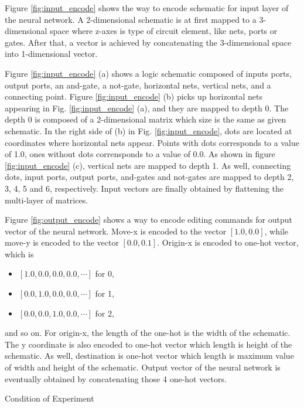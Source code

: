 \documentclass[twocolumn]{article}
\makeatletter
\def\section{\@startsection {section}{1}{\z@}{20pt plus 2pt minus 2pt}
{8pt plus 2pt minus 2pt}{\centering\normalsize\sc
\edef\@svsec{\thesection.\ }}}
\def\thesection{\Roman{section}}
\makeatother
\begin{document}
Figure \ref{fig:input_encode} shows the way to encode schematic
for input layer of the neural network.
A 2-dimensional schematic is at first mapped to a 3-dimensional space
where z-axes is type of circuit element, like nets, ports or gates.
After that, a vector is achieved by concatenating the 3-dimensional space
into 1-dimensional vector.

Figure \ref{fig:input_encode} (a) shows a logic schematic composed of
inputs ports, output ports, an and-gate, a not-gate,
horizontal nets, vertical nets, and a connecting point.
Figure \ref{fig:input_encode} (b) picks up horizontal nets appearing
in Fig. \ref{fig:input_encode} (a), and they are mapped to depth 0.
The depth 0 is composed of a 2-dimensional matrix which size is the same
as given schematic.
In the right side of (b) in Fig. \ref{fig:input_encode},
dots are located at coordinates where horizontal nets appear.
Points with dots corresponds to a value of 1.0, ones without dots
corrensponds to a value of 0.0.
As shown in figure \ref{fig:input_encode} (c),
vertical nets are mapped to depth 1.
As well, connecting dots, input ports, output ports, and-gates and not-gates
are mapped to depth 2, 3, 4, 5 and 6, respectively.
Input vectors are finally obtained by flattening the multi-layer of matrices.

Figure \ref{fig:output_encode} shows a way to encode editing commands
for output vector of the neural network.
Move-x is encoded to the vector $[1.0, 0.0]$, 
while move-y is encoded to the vector $[0.0, 0.1]$. 
Origin-x is encoded to one-hot vector, which is
\begin{itemize}
\item $[1.0, 0.0, 0.0, 0.0, \cdots]$ for 0,
\item $[0.0, 1.0, 0.0, 0.0, \cdots]$ for 1, 
\item $[0.0, 0.0, 1.0, 0.0, \cdots]$ for 2,
\end{itemize}
and so on.
For origin-x, the length of the one-hot is the width of the schematic.
The y coordinate is also encoded to one-hot vector which length is
height of the schematic.
As well, destination is one-hot vector which length is
maximum value of width and height of the schematic.
Output vector of the neural network is eventually obtained
by concatenating those 4 one-hot vectors.

\section{Condition of Experiment}
\end{document}
